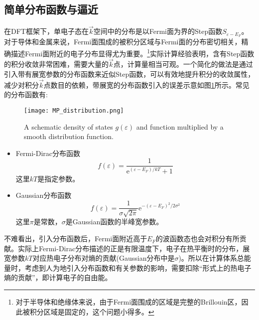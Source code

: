 \subsection{简单分布函数与逼近}
在\textrm{DFT}框架下，单电子态在$\vec k$空间中的分布是以\textrm{Fermi}面为界的\textrm{Step}函数$S_{\varepsilon-E_F}$。对于导体和金属来说，\textrm{Fermi}面围成的被积分区域与\textrm{Fermi}面的分布密切相关，精确描述\textrm{Fermi}面附近的电子分布显得尤为重要。\footnote{对于半导体和绝缘体来说，由于\textrm{Fermi}面围成的区域是完整的\textrm{Brillouin}区，因此被积分区域是固定的，这个问题小得多。}实际计算经验表明，含有\textrm{Step}函数的积分收敛非常困难，需要大量的$\vec k$点，计算量相当可观。一个简化的做法是通过引入带有展宽参数的分布函数来近似\textrm{Step}函数，可以有效地提升积分的收敛属性，减少对积分$\vec k$点数目的依赖，带展宽的分布函数引入的误差示意如图\ref{MP_distribution}所示。常见的分布函数有:~
\begin{figure}[h!]
\centering
\vspace*{-0.2in}
\texttt{[image: MP\_distribution.png]}
\caption{\textrm{A schematic density of states $g(\varepsilon)$ and function multiplied by a smooth distribution function.}}%
\label{MP_distribution}
\end{figure} 
\begin{itemize}
	\item \textrm{Fermi-Dirac}分布函数
		\begin{equation}
			f(\varepsilon)=\dfrac1{\mathrm{e}^{(\varepsilon-E_F)/kT}+1}
			\label{eq:solid_kpoint-Fermi-Dirac}
		\end{equation}
		这里$kT$是指定参数。
	\item \textrm{Gaussian}分布函数
		\begin{equation}
			f(\varepsilon)=\dfrac1{\sigma\sqrt{2\pi}}\mathrm{e}^{-(\varepsilon-E_F)^2/2\sigma^2}
			\label{eq:solid_kpoint-Gaussian}
		\end{equation}
		这里$\pi$是常数，$\sigma$是\textrm{Gaussian}函数的半峰宽参数。
\end{itemize}

不难看出，引入分布函数后，\textrm{Fermi}面附近高于$E_F$的波函数态也会对积分有所贡献。实际上\textrm{Fermi-Dirac}分布描述的正是有限温度下，电子在热平衡时的分布，展宽参数$kT$对应热电子分布对熵的贡献(\textrm{Gaussian}分布中是$\sigma$)。所以在计算体系总能量时，考虑到人为地引入分布函数和有关参数的影响，需要扣除“形式上的热电子熵的贡献”，即计算电子的自由能。

